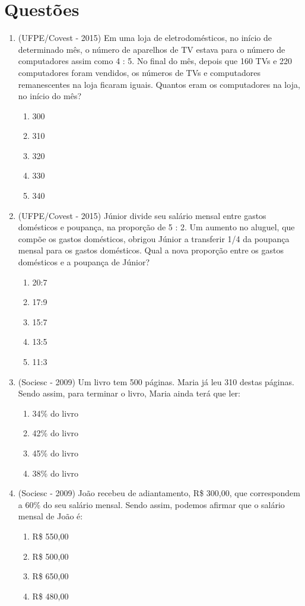  \section{Questões}
 \begin{enumerate}
  \item (UFPE/Covest - 2015) Em uma loja de eletrodomésticos, no início de determinado mês, o número de aparelhos de TV estava para o número de computadores assim como 4 : 5. No final do mês, depois que 160 TVs e 220 computadores foram vendidos, os números de TVs e computadores remanescentes na loja ficaram iguais. Quantos eram os computadores na loja, no início do mês?
  \begin{enumerate}
  \item 300
  \item 310
  \item 320
  \item 330
  \item 340
  \end{enumerate}
  
  \item (UFPE/Covest - 2015) Júnior divide seu salário mensal entre gastos domésticos e poupança, na proporção de 5 : 2. Um aumento no aluguel, que compõe os gastos domésticos, obrigou Júnior a transferir 1/4 da poupança mensal para os gastos domésticos. Qual a nova proporção entre os gastos domésticos e a poupança de Júnior?
  \begin{enumerate}
  \item 20:7
  \item 17:9
  \item 15:7
  \item 13:5
  \item 11:3
  \end{enumerate}

 \item (Sociesc - 2009) Um livro tem 500 páginas. Maria já leu 310 destas páginas. Sendo assim, para terminar o livro, Maria ainda terá que ler:
  \begin{enumerate}
  \item 34\% do livro
  \item 42\% do livro
  \item 45\% do livro
  \item 38\% do livro
 \end{enumerate}

 \item (Sociesc - 2009) João recebeu de adiantamento, R\$ 300,00, que correspondem a 60\% do seu salário mensal. Sendo assim, podemos afirmar que o salário mensal de João é:
 \begin{enumerate}
  \item R\$ 550,00
  \item R\$ 500,00
  \item R\$ 650,00
  \item R\$ 480,00
 \end{enumerate}


\end{enumerate}
